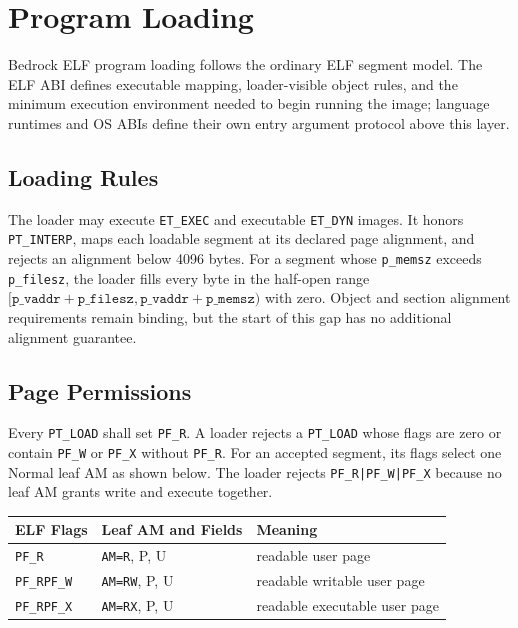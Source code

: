 \documentclass[10pt,twoside]{article}
\begin{document}
\clearpage
\section{Program Loading}\label{page:program-loading}
Bedrock ELF program loading follows the ordinary ELF segment model. The ELF ABI defines executable mapping, loader-visible object rules, and the minimum execution environment needed to begin running the image; language runtimes and OS ABIs define their own entry argument protocol above this layer.
\subsection{Loading Rules}
The loader may execute \texttt{ET\_EXEC} and executable \texttt{ET\_DYN}
images. It honors \texttt{PT\_INTERP}, maps each loadable segment at its
declared page alignment, and rejects an alignment below 4096 bytes. For a
segment whose \texttt{p\_memsz} exceeds \texttt{p\_filesz}, the loader fills
every byte in the half-open range
$[\texttt{p\_vaddr}+\texttt{p\_filesz},
\texttt{p\_vaddr}+\texttt{p\_memsz})$ with zero. Object and section alignment
requirements remain binding, but the start of this gap has no additional
alignment guarantee.
\subsection{Page Permissions}
Every \texttt{PT\_LOAD} shall set \texttt{PF\_R}. A loader rejects a
\texttt{PT\_LOAD} whose flags are zero or contain \texttt{PF\_W} or
\texttt{PF\_X} without \texttt{PF\_R}. For an accepted segment, its flags
select one Normal leaf AM as shown below. The loader rejects
\texttt{PF\_R|PF\_W|PF\_X} because no leaf AM grants write and execute
together.

\begingroup\footnotesize
\setlength{\tabcolsep}{2pt}
\begin{longtable}{@{}p{1.2in}p{1.45in}p{2.85in}@{}}
\toprule
\textbf{ELF Flags} & \textbf{Leaf AM and Fields} & \textbf{Meaning}\\
\midrule
\endhead
\texttt{PF\_\allowbreak{}R} & \texttt{AM=R}, P, U & readable user page\\
\texttt{PF\_\allowbreak{}R\textbar{}PF\_\allowbreak{}W} & \texttt{AM=RW}, P, U & readable writable user page\\
\texttt{PF\_\allowbreak{}R\textbar{}PF\_\allowbreak{}X} & \texttt{AM=RX}, P, U & readable executable user page\\
\bottomrule
\end{longtable}
\endgroup
\end{document}
